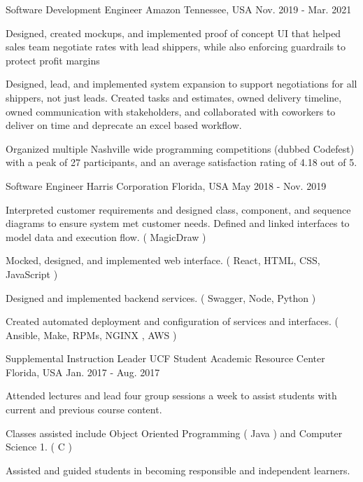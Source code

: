 \begin{cventries}
  \cventry
    {Software Development Engineer} %
    {Amazon} %
    {Tennessee, USA} %
    {Nov. 2019 - Mar. 2021} %
    {
      \begin{cvitems} %
        \item {Designed, created mockups, and implemented proof of concept UI that helped sales team negotiate rates with lead shippers, while also enforcing guardrails to protect profit margins}
        \item {Designed, lead, and implemented system expansion to support negotiations for all shippers, not just leads. Created tasks and estimates, owned delivery timeline, owned communication with stakeholders, and collaborated with coworkers to deliver on time and deprecate an excel based workflow.}
        \item {Organized multiple Nashville wide programming competitions (dubbed Codefest) with a peak of 27 participants, and an average satisfaction rating of 4.18 out of 5.}
      \end{cvitems}
    }

  \cventry
    {Software Engineer} %
    {Harris Corporation} %
    {Florida, USA} %
    {May 2018 - Nov. 2019} %
    {
      \begin{cvitems} %
        \item {Interpreted customer requirements and designed class, component, and sequence diagrams to ensure system met customer needs. Defined and linked interfaces to model data and execution flow. ( MagicDraw )}
        \item {Mocked, designed, and implemented web interface. ( React, HTML, CSS, JavaScript )}
        \item {Designed and implemented backend services. ( Swagger, Node, Python )}
        \item {Created automated deployment and configuration of services and interfaces. ( Ansible, Make, RPMs, NGINX , AWS )}
      \end{cvitems}
    }

  \cventry
    {Supplemental Instruction Leader} %
    {UCF Student Academic Resource Center} %
    {Florida, USA} %
    {Jan. 2017 - Aug. 2017} %
    {
      \begin{cvitems} %
        \item {Attended lectures and lead four group sessions a week to assist students with current and previous course content.}
        \item {Classes assisted include Object Oriented Programming ( Java ) and Computer Science 1. ( C )}
        \item {Assisted and guided students in becoming responsible and independent learners.}
      \end{cvitems}
    }

\end{cventries}
